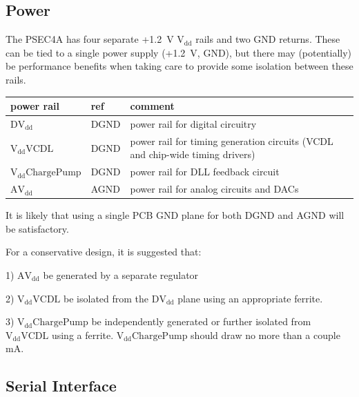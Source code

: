 \documentclass[12pt]{article}
\begin{document}
\subsection*{Power}
The PSEC4A has four separate +1.2~V $\mathrm{V_{dd}}$ rails and two GND returns.
These can be tied to a single power supply (+1.2~V, GND), but there may (potentially) be
performance benefits when taking care to provide some isolation between these rails. 

\begin{center}
\begin{tabular}[h!]{l|l|p{10cm}}
  \hline
   power rail       & ref &  comment \\ \hline
   $\mathrm{DV_{dd}}$ &  DGND  &  power rail for digital circuitry  \\ \hline
   $\mathrm{V_{dd}VCDL}$ &  DGND  &  power rail for timing generation circuits (VCDL and chip-wide timing drivers) \\ \hline
   $\mathrm{V_{dd}ChargePump}$ &  DGND  &  power rail for DLL feedback circuit \\ \hline
   $\mathrm{AV_{dd}}$ &  AGND  &  power rail for analog circuits and DACs \\ \hline

\end{tabular}
\end{center}

It is likely that using a single PCB GND plane for both DGND and AGND will be satisfactory.

For a conservative design, it is suggested that: 

1) $\mathrm{AV_{dd}}$ be generated by a separate regulator

2) $\mathrm{V_{dd}VCDL}$ be isolated from the $\mathrm{DV_{dd}}$ plane using an appropriate ferrite.

3) $\mathrm{V_{dd}ChargePump}$ be independently generated or further isolated from  $\mathrm{V_{dd}VCDL}$ using a ferrite.
$\mathrm{V_{dd}ChargePump}$ should draw no more than a couple mA.

\subsection*{Serial Interface}
\end{document}
